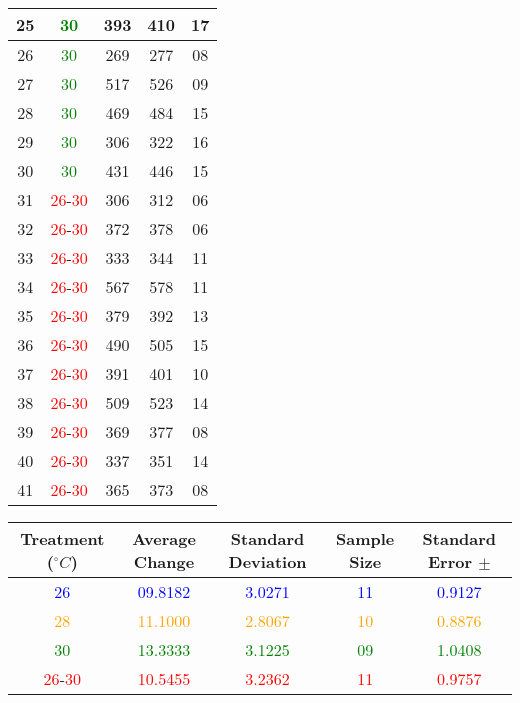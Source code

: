 \documentclass{article}
\def\B#1{\textcolor{BLUE}{#1}}
\def\O#1{\textcolor{ORANGE}{#1}}
\def\G#1{\textcolor{GREEN}{#1}}
\def\R#1{\textcolor{RED}{#1}}
\begin{document}
\begin{table}[h]
\begin{center}
\begin{tabular}{|c|c|c|c|c|}
      25 & \G{30} & 393 & 410 & 17 \\\hline
      26 & \G{30} & 269 & 277 & 08 \\\hline
      27 & \G{30} & 517 & 526 & 09 \\\hline
      28 & \G{30} & 469 & 484 & 15 \\\hline
      29 & \G{30} & 306 & 322 & 16 \\\hline
      30 & \G{30} & 431 & 446 & 15 \\\hline %
      31 & \R{26}-\R{30} & 306 & 312 & 06 \\\hline %
      32 & \R{26}-\R{30} & 372 & 378 & 06 \\\hline
      33 & \R{26}-\R{30} & 333 & 344 & 11 \\\hline
      34 & \R{26}-\R{30} & 567 & 578 & 11 \\\hline
      35 & \R{26}-\R{30} & 379 & 392 & 13 \\\hline
      36 & \R{26}-\R{30} & 490 & 505 & 15 \\\hline
      37 & \R{26}-\R{30} & 391 & 401 & 10 \\\hline
      38 & \R{26}-\R{30} & 509 & 523 & 14 \\\hline
      39 & \R{26}-\R{30} & 369 & 377 & 08 \\\hline
      40 & \R{26}-\R{30} & 337 & 351 & 14 \\\hline
      41 & \R{26}-\R{30} & 365 & 373 & 08 \\\hline %
    \end{tabular}
  \end{center}
\end{table}
\newpage

\begin{table}[h]
  \begin{center}
    \begin{tabular}{|c|c|c|c|c|}\hline
      Treatment (\(^\circ C\)) & Average Change & Standard Deviation & Sample Size & Standard Error \(\pm \)\\\hline
      \B{26} & \B{09.8182} & \B{3.0271} & \B{11} & \B{0.9127} \\\hline
      \O{28} & \O{11.1000} & \O{2.8067} & \O{10} & \O{0.8876} \\\hline
      \G{30} & \G{13.3333} & \G{3.1225} & \G{09} & \G{1.0408} \\\hline
      \R{26}-\R{30} & \R{10.5455} & \R{3.2362} & \R{11} & \R{0.9757} \\\hline
    \end{tabular}
  \end{center}
\end{table}
\end{document}
